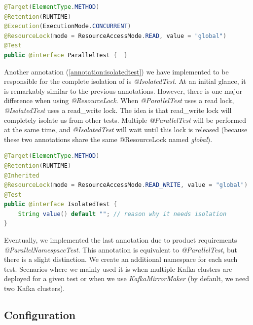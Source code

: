 \begin{lstlisting}[language=Java,label=annotation:paralleltest,caption=Implementation of the @ParallelTest annotation,frame=tb]
@Target(ElementType.METHOD)
@Retention(RUNTIME)
@Execution(ExecutionMode.CONCURRENT)
@ResourceLock(mode = ResourceAccessMode.READ, value = "global")
@Test
public @interface ParallelTest {  }
\end{lstlisting}
Another annotation (\ref{annotation:isolatedtest}) we have implemented to be responsible for the complete isolation of is \emph{@IsolatedTest}.
At an initial glance, it is remarkably similar to the previous annotations.
However, there is one major difference when using \emph{@ResourceLock}.
When \emph {@ParallelTest} uses a read lock, \emph{@IsolatedTest} uses a read\_write lock.
The idea is that read\_write lock will completely isolate us from other tests.
Multiple \emph{@ParallelTest} will be performed at the same time, and \emph{@IsolatedTest} will wait until this lock is
released (because these two annotations share the same @ResourceLock named \emph{global}).

\begin{lstlisting}[language=Java,label=annotation:isolatedtest,caption=Implementation of the @IsolatedTest annotation,frame=tb]
@Target(ElementType.METHOD)
@Retention(RUNTIME)
@Inherited
@ResourceLock(mode = ResourceAccessMode.READ_WRITE, value = "global")
@Test
public @interface IsolatedTest {
    String value() default ""; // reason why it needs isolation
}
\end{lstlisting}
Eventually, we implemented the last annotation due to product requirements \emph{@ParallelNamespaceTest}.
This annotation is equivalent to \emph{@ParallelTest}, but there is a slight distinction.
We create an additional namespace for each such test.
Scenarios where we mainly used it is when multiple Kafka clusters are deployed for a given test or when we use \emph{KafkaMirrorMaker} (by default, we need two Kafka clusters).

\subsection{Configuration}
\label{05:sub:sec:configuration}

